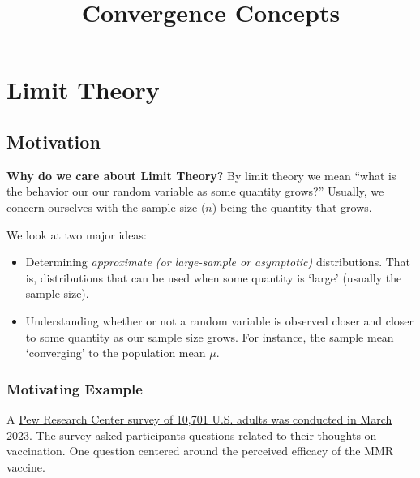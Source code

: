 \documentclass[
]{article}
\title{Convergence Concepts}
\author{}
\date{\vspace{-2.5em}}
\providecommand{\tightlist}{%
  \setlength{\itemsep}{0pt}\setlength{\parskip}{0pt}}
\begin{document}
\maketitle

\hypertarget{limit-theory}{%
\section{Limit Theory}\label{limit-theory}}

\hypertarget{motivation}{%
\subsection{Motivation}\label{motivation}}

\textbf{Why do we care about Limit Theory?} By limit theory we mean
``what is the behavior our our random variable as some quantity grows?''
Usually, we concern ourselves with the sample size (\(n\)) being the
quantity that grows.

We look at two major ideas:

\begin{itemize}
\tightlist
\item
  Determining \textit{approximate (or large-sample or asymptotic)}
  distributions. That is, distributions that can be used when some
  quantity is `large' (usually the sample size).
\item
  Understanding whether or not a random variable is observed closer and
  closer to some quantity as our sample size grows. For instance, the
  sample mean `converging' to the population mean \(\mu\).
\end{itemize}

\hypertarget{motivating-example}{%
\subsubsection{Motivating Example}\label{motivating-example}}

A
\href{https://www.pewresearch.org/science/2023/05/16/americans-largely-positive-views-of-childhood-vaccines-hold-steady/}{Pew
Research Center survey of 10,701 U.S. adults was conducted in March
2023}. The survey asked participants questions related to their thoughts
on vaccination. One question centered around the perceived efficacy of
the MMR vaccine.
\end{document}
